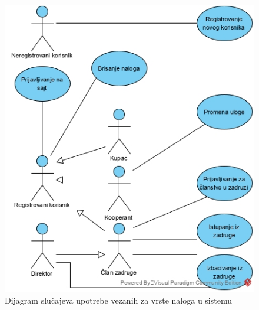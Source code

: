 \documentclass[a4paper]{article}
\begin{document}
\begin{figure}[h!]
    \centering
    \includegraphics[scale=0.5]{images/clanstvoSU.jpg}
    \caption{Dijagram slučajeva upotrebe vezanih za vrste naloga u sistemu}
    \label{slika1}
\end{figure}

\clearpage
\end{document}
